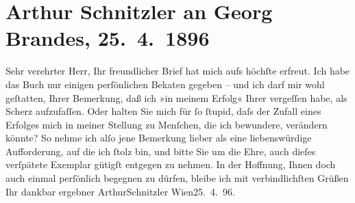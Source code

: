 

         
         \renewcommand{\erwaehntePersonen}{Personen: Georg Brandes}
         \renewcommand{\erwaehnteOrte}{Orte: Wien}
         \renewcommand{\erwaehnteWerke}{Werke: Liebelei. Schauspiel in drei Akten}
               \section[Arthur Schnitzler an Georg Brandes, 25. 4. 1896]{ Arthur Schnitzler an Georg Brandes, 25. 4. 1896}\nopagebreak{}\rehead{ }\begin{ledgroupsized}[t]{13cm}\normalsize\beginnumbering{} \toendnotes[C]{\smallbreak\pagebreak[2]} 
\toendnotes[C]{\smallbreak}\pstart\center{}{\pb}Sehr verehrter Herr,\pend\pstart
           Ihr freundlicher Brief hat mich aufs höchſte erfreut. Ich habe das Buch nur einigen perſönlichen Beka{\geminationn}ten gegeben – und ich darf mir wohl geſtatten, Ihrer
               Bemerkung, daß ich »in meinem Erfolg« Ihrer vergeſſen habe, als Scherz aufzufaſſen.
                  {\pb}Oder halten Sie mich für ſo ſtupid, daſs der
               Zufall eines Erfolges mich in meiner Stellung zu Menſchen, die ich bewundere,
               verändern könnte? So nehme ich alſo jene Bemerkung lieber als eine liebenswürdige
               Aufforderung, auf die ich ſtolz bin, und bitte Sie um die Ehre, auch dieſes
               verſpätete Exemplar gütigſt
               entgegen zu nehmen.\pend
           \pstart {\pb}In der Hoffnung, Ihnen doch auch einmal
               perſönlich begegnen zu dürfen, bleibe ich mit verbindlichſten Grüßen Ihr dankbar
               ergebner \spacefill\mbox{ArthurSchnitzler}\pend{}\pstart
           Wien25. 4. 96.\pend
           
         
         \endnumbering{}\end{ledgroupsized}  \newcommand{\dateiname}{L00542}\newcommand{\titel}{Arthur Schnitzler an Georg Brandes, 25. 4. 1896}\newcommand{\editorInnen}{Martin Anton Müller und Gerd-Hermann Susen}
      